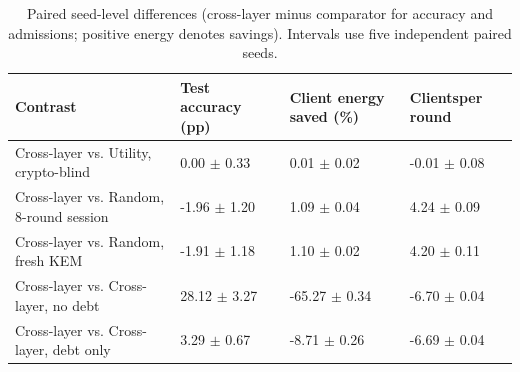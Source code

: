 \begin{table}[!ht]
\caption{Paired seed-level differences (cross-layer minus comparator for accuracy and admissions; positive energy denotes savings). Intervals use five independent paired seeds.}
\label{tab:paired}
\centering
\setlength{\tabcolsep}{2pt}
\begin{tabular}{|p{}|p{}|p{}|p{}|}
\hline
Contrast & Test accuracy (pp) & Client energy saved (\%) & Clients\newline{}per round \\
\hline
Cross-layer vs. Utility, crypto-blind & 0.00 $\pm$ 0.33 & 0.01 $\pm$ 0.02 & -0.01 $\pm$ 0.08 \\
\hline
Cross-layer vs. Random, 8-round session & -1.96 $\pm$ 1.20 & 1.09 $\pm$ 0.04 & 4.24 $\pm$ 0.09 \\
\hline
Cross-layer vs. Random, fresh KEM & -1.91 $\pm$ 1.18 & 1.10 $\pm$ 0.02 & 4.20 $\pm$ 0.11 \\
\hline
Cross-layer vs. Cross-layer, no debt & 28.12 $\pm$ 3.27 & -65.27 $\pm$ 0.34 & -6.70 $\pm$ 0.04 \\
\hline
Cross-layer vs. Cross-layer, debt only & 3.29 $\pm$ 0.67 & -8.71 $\pm$ 0.26 & -6.69 $\pm$ 0.04 \\
\hline
\end{tabular}
\end{table}
